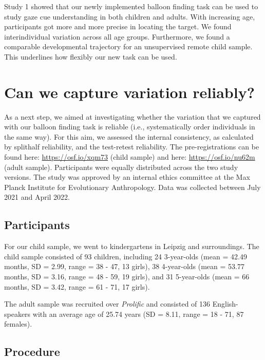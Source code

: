 \documentclass[
  man,floatsintext]{apa6}
\begin{document}
Study 1 showed that our newly implemented balloon finding task can be used to study gaze cue understanding in both children and adults. With increasing age, participants got more and more precise in locating the target. We found interindividual variation across all age groups. Furthermore, we found a comparable developmental trajectory for an unsupervised remote child sample. This underlines how flexibly our new task can be used.

\hypertarget{can-we-capture-variation-reliably}{%
\section{Can we capture variation reliably?}\label{can-we-capture-variation-reliably}}

As a next step, we aimed at investigating whether the variation that we captured with our balloon finding task is reliable (i.e.,
systematically order individuals in the same way). For this aim, we assessed the internal consistency, as calculated by splithalf reliability, and the test-retest reliability. The pre-registrations can be found here: \url{https://osf.io/xqm73} (child sample) and here: \url{https://osf.io/nu62m} (adult sample). Participants were equally distributed across the two study versions. The study was approved by an internal ethics committee at the Max Planck Institute for Evolutionary Anthropology. Data was collected between July 2021 and April 2022.

\hypertarget{participants-1}{%
\subsection{Participants}\label{participants-1}}

For our child sample, we went to kindergartens in Leipzig and surroundings.
The child sample consisted of
93 children, including
24 3-year-olds
(mean = 42.49 months,
SD = 2.99,
range = 38
- 47,
13 girls),
38 4-year-olds
(mean = 53.77 months,
SD = 3.16,
range = 48
- 59,
19 girls),
and 31 5-year-olds
(mean = 66 months,
SD = 3.42,
range = 61
- 71,
17 girls).

The adult sample was recruited over \emph{Prolific} and consisted of 136 English-speakers with an average age of 25.74 years (SD = 8.11, range = 18 - 71, 87 females).

\hypertarget{procedure-1}{%
\subsection{Procedure}\label{procedure-1}}
\end{document}
